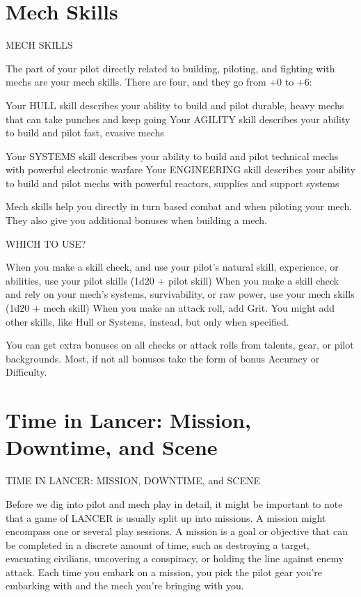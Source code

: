 \chapter{Mech Skills}
                                              MECH SKILLS  

The part of your pilot directly related to building, piloting, and fighting with mechs are your mech  
skills. There are four, and they go from +0 to +6:  

Your HULL skill describes your ability to build and pilot durable, heavy mechs that can take  
punches and keep going  
Your AGILITY skill describes your ability to build and pilot fast, evasive mechs  

                                                                                                                 


Your SYSTEMS skill describes your ability to build and pilot technical mechs with powerful  
electronic warfare  
Your ENGINEERING skill describes your ability to build and pilot mechs with powerful reactors,  
supplies and support systems  

Mech skills help you directly in turn based combat and when piloting your mech. They also give  
you additional bonuses when building a mech.  

                                              WHICH TO USE? 

When you make a skill check, and use your pilot’s natural skill, experience, or abilities, use your 
pilot skills (1d20 + pilot skill) 
When you make a skill check and rely on your mech’s systems, survivability, or raw power, use 
your mech skills (1d20 + mech skill) 
When you make an attack roll, add Grit. You might add other skills, like Hull or Systems, instead, 
but only when specified. 

You can get extra bonuses on all checks or attack rolls from talents, gear, or pilot backgrounds. 
Most, if not all bonuses take the form of bonus Accuracy or Difficulty. 

\chapter{Time in Lancer: Mission, Downtime, and Scene}         
               TIME IN LANCER: MISSION, DOWNTIME, and SCENE 

Before we dig into pilot and mech play in detail, it might be important to note that a game of 
LANCER is usually split up into missions. A mission might encompass one or several play 
sessions. A mission is a goal or objective that can be completed in a discrete amount of time, 
such as destroying a target, evacuating civilians, uncovering a conspiracy, or holding the line 
against enemy attack. Each time you embark on a mission, you pick the pilot gear you’re 
embarking with and the mech you’re bringing with you. 

